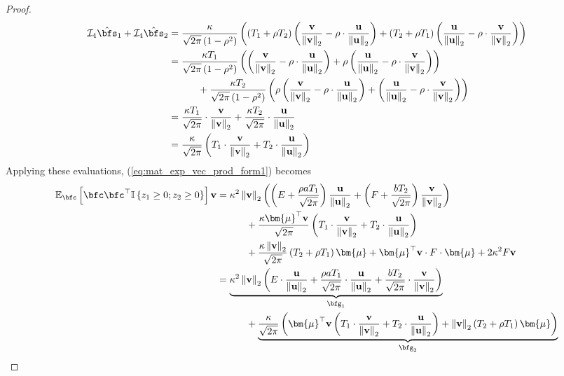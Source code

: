 \documentclass[10pt]{article} %
\theoremstyle{definition}
\theoremstyle{plain}
\newcommand{\paren}[1]{\left(#1\right)}
\newcommand{\norm}[1]{\left\|#1\right\|}
\newcommand{\indy}[1]{\mathbb{I}\left\{#1\right\}}
\providecommand{\E}{\mathbb{E}}
\def\bfu{{\mathbf{u}}}\def\bfv{{\mathbf{v}}}\def\bfw{{\mathbf{w}}}\def\bfx{{\mathbf{x}}}
\begin{document}
\begin{proof}
    \begin{align*}
        \mathcal{I}_4\hat{\bfs}_1 + \mathcal{I}_4\hat{\bfs}_2 & = \frac{\kappa}{\sqrt{2\pi}\paren{1-\rho^2}}\paren{\paren{T_1 + \rho T_2}\paren{\frac{\bfv}{\norm{\bfv}_2} - \rho\cdot\frac{\bfu}{\norm{\bfu}_2}} + \paren{T_2 + \rho T_1}\paren{\frac{\bfu}{\norm{\bfu}_2} - \rho\cdot\frac{\bfv}{\norm{\bfv}_2}}}\\
        & = \frac{\kappa T_1}{\sqrt{2\pi}\paren{1-\rho^2}}\paren{\paren{\frac{\bfv}{\norm{\bfv}_2} - \rho\cdot\frac{\bfu}{\norm{\bfu}_2}} + \rho\paren{\frac{\bfu}{\norm{\bfu}_2} - \rho\cdot\frac{\bfv}{\norm{\bfv}_2}}}\\
        &\quad\quad\quad +\frac{\kappa T_2}{\sqrt{2\pi}\paren{1-\rho^2}}\paren{\rho\paren{\frac{\bfv}{\norm{\bfv}_2} - \rho\cdot\frac{\bfu}{\norm{\bfu}_2}} + \paren{\frac{\bfu}{\norm{\bfu}_2} - \rho\cdot\frac{\bfv}{\norm{\bfv}_2}}}\\
        & = \frac{\kappa T_1}{\sqrt{2\pi}}\cdot\frac{\bfv}{\norm{\bfv}_2} + \frac{\kappa T_2}{\sqrt{2\pi}}\cdot\frac{\bfu}{\norm{\bfu}_2}\\
        & = \frac{\kappa}{\sqrt{2\pi}}\paren{T_1\cdot \frac{\bfv}{\norm{\bfv}_2} + T_2\cdot \frac{\bfu}{\norm{\bfu}_2}}
    \end{align*}
    Applying these evaluations, (\ref{eq:mat_exp_vec_prod_form1}) becomes
    \begin{equation}
        \label{eq:mat_exp_vec_prod_form2}
        \begin{aligned}
            \E_{\bfc}\left[\bfc\bfc^\top\indy{z_1\geq 0;z_2\geq 0}\right]\bfv & = \kappa^2\norm{\bfv}_2\paren{\paren{E + \frac{\rho a T_1}{\sqrt{2\pi}}}\frac{\bfu}{\norm{\bfu}_2} + \paren{F + \frac{b T_2}{\sqrt{2\pi}}}\frac{\bfv}{\norm{\bfv}_2}}\\
            &\quad\quad\quad + \frac{\kappa\bm{\mu}^\top\bfv}{\sqrt{2\pi}}\paren{T_1\cdot \frac{\bfv}{\norm{\bfv}_2} + T_2\cdot \frac{\bfu}{\norm{\bfu}_2}}\\
            &\quad\quad\quad + \frac{\kappa\norm{\bfv}_2}{\sqrt{2\pi}}\paren{T_2 + \rho T_1}\bm{\mu} + \bm{\mu}^\top\bfv\cdot F\cdot \bm{\mu} + 2\kappa^2F\bfv\\
            & = \underbrace{\kappa^2\norm{\bfv}_2\paren{E\cdot \frac{\bfu}{\norm{\bfu}_2} + \frac{\rho a T_1}{\sqrt{2\pi}}\cdot \frac{\bfu}{\norm{\bfu}_2} + \frac{b T_2}{\sqrt{2\pi}}\cdot \frac{\bfv}{\norm{\bfv}_2}}}_{\bfg_1}\\
            & \quad\quad\quad + \underbrace{\frac{\kappa}{\sqrt{2\pi}}\paren{\bm{\mu}^\top\bfv\paren{T_1\cdot \frac{\bfv}{\norm{\bfv}_2} + T_2\cdot \frac{\bfu}{\norm{\bfu}_2}} + \norm{\bfv}_2\paren{T_2 + \rho T_1}\bm{\mu}}}_{\bfg_2}\\

\end{aligned}
\end{equation}
\end{proof}
\end{document}
